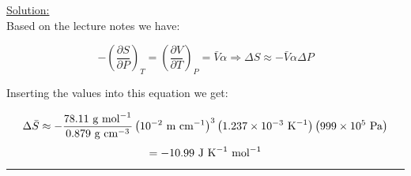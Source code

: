 \noindent
\underline{Solution:}\\

Based on the lecture notes we have:

$$-\left(\frac{\partial S}{\partial P}\right)_T = \left(\frac{\partial V}{\partial T}\right)_P = \bar{V}\alpha \Rightarrow \Delta S \approx -\bar{V}\alpha\Delta P$$

Inserting the values into this equation we get:

$$\Delta \bar{S}\approx -\frac{78.11\textnormal{ g mol}^{-1}}{0.879\textnormal{ g cm}^{-3}}\left(10^{-2}\textnormal{ m cm}^{-1}\right)^3\left(1.237\times 10^{-3}\textnormal{ K}^{-1}\right)\left(999\times 10^5\textnormal{ Pa}\right)$$
$$ = -10.99\textnormal{ J K}^{-1}\textnormal{ mol}^{-1}$$

\hrule\vspace{0.5cm}
